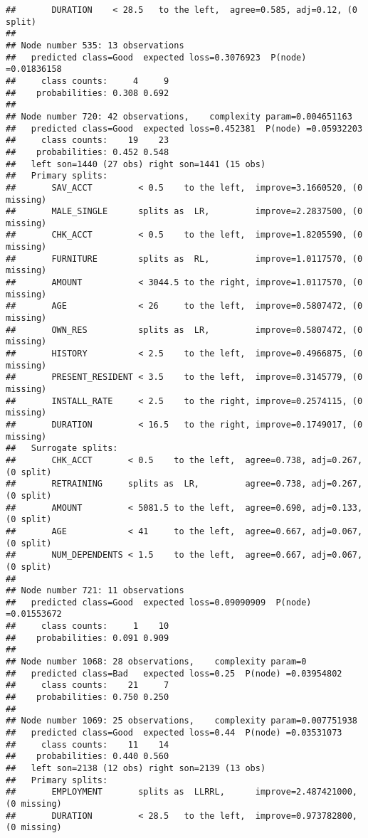 \documentclass[
]{article}
\begin{document}
\begin{verbatim}
##       DURATION    < 28.5   to the left,  agree=0.585, adj=0.12, (0 split)
## 
## Node number 535: 13 observations
##   predicted class=Good  expected loss=0.3076923  P(node) =0.01836158
##     class counts:     4     9
##    probabilities: 0.308 0.692 
## 
## Node number 720: 42 observations,    complexity param=0.004651163
##   predicted class=Good  expected loss=0.452381  P(node) =0.05932203
##     class counts:    19    23
##    probabilities: 0.452 0.548 
##   left son=1440 (27 obs) right son=1441 (15 obs)
##   Primary splits:
##       SAV_ACCT         < 0.5    to the left,  improve=3.1660520, (0 missing)
##       MALE_SINGLE      splits as  LR,         improve=2.2837500, (0 missing)
##       CHK_ACCT         < 0.5    to the left,  improve=1.8205590, (0 missing)
##       FURNITURE        splits as  RL,         improve=1.0117570, (0 missing)
##       AMOUNT           < 3044.5 to the right, improve=1.0117570, (0 missing)
##       AGE              < 26     to the left,  improve=0.5807472, (0 missing)
##       OWN_RES          splits as  LR,         improve=0.5807472, (0 missing)
##       HISTORY          < 2.5    to the left,  improve=0.4966875, (0 missing)
##       PRESENT_RESIDENT < 3.5    to the left,  improve=0.3145779, (0 missing)
##       INSTALL_RATE     < 2.5    to the right, improve=0.2574115, (0 missing)
##       DURATION         < 16.5   to the right, improve=0.1749017, (0 missing)
##   Surrogate splits:
##       CHK_ACCT       < 0.5    to the left,  agree=0.738, adj=0.267, (0 split)
##       RETRAINING     splits as  LR,         agree=0.738, adj=0.267, (0 split)
##       AMOUNT         < 5081.5 to the left,  agree=0.690, adj=0.133, (0 split)
##       AGE            < 41     to the left,  agree=0.667, adj=0.067, (0 split)
##       NUM_DEPENDENTS < 1.5    to the left,  agree=0.667, adj=0.067, (0 split)
## 
## Node number 721: 11 observations
##   predicted class=Good  expected loss=0.09090909  P(node) =0.01553672
##     class counts:     1    10
##    probabilities: 0.091 0.909 
## 
## Node number 1068: 28 observations,    complexity param=0
##   predicted class=Bad   expected loss=0.25  P(node) =0.03954802
##     class counts:    21     7
##    probabilities: 0.750 0.250 
## 
## Node number 1069: 25 observations,    complexity param=0.007751938
##   predicted class=Good  expected loss=0.44  P(node) =0.03531073
##     class counts:    11    14
##    probabilities: 0.440 0.560 
##   left son=2138 (12 obs) right son=2139 (13 obs)
##   Primary splits:
##       EMPLOYMENT       splits as  LLRRL,      improve=2.487421000, (0 missing)
##       DURATION         < 28.5   to the left,  improve=0.973782800, (0 missing)

\end{verbatim}
\end{document}
